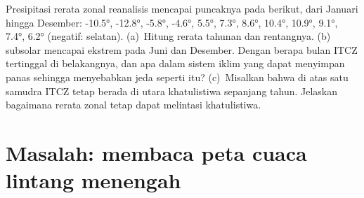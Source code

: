 \begin{exercise}[$\star\star\star$]\label{exo:b1:atmospheric-circulation:12}
Presipitasi rerata zonal reanalisis mencapai puncaknya pada  berikut, dari Januari
hingga Desember: \ang{-10.5}, \ang{-12.8}, \ang{-5.8}, \ang{-4.6}, \ang{5.5},
\ang{7.3}, \ang{8.6}, \ang{10.4}, \ang{10.9}, \ang{9.1}, \ang{7.4}, \ang{6.2}
(negatif: selatan). (a)~Hitung rerata tahunan dan rentangnya. (b)~ subsolar
mencapai ekstrem pada Juni dan Desember. Dengan berapa bulan ITCZ tertinggal di
belakangnya, dan apa dalam sistem iklim yang dapat menyimpan panas sehingga menyebabkan jeda seperti itu?
(c)~Misalkan bahwa di atas satu samudra ITCZ tetap berada di utara khatulistiwa sepanjang tahun.
Jelaskan bagaimana rerata zonal tetap dapat melintasi khatulistiwa.
\end{exercise}

\section{Masalah: membaca peta cuaca lintang menengah}

